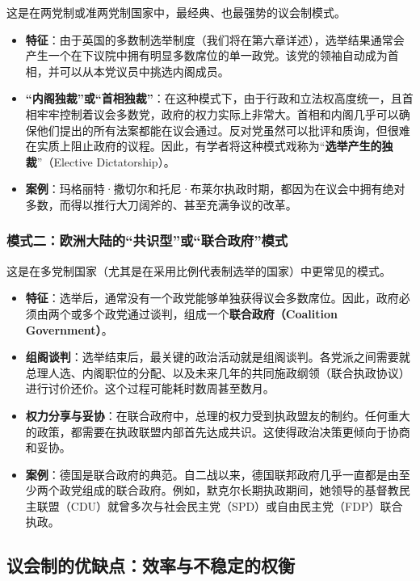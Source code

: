 这是在两党制或准两党制国家中，最经典、也最强势的议会制模式。
\begin{itemize}
    \item \textbf{特征}：由于英国的多数制选举制度（我们将在第六章详述），选举结果通常会产生一个在下议院中拥有明显多数席位的单一政党。该党的领袖自动成为首相，并可以从本党议员中挑选内阁成员。
    \item \textbf{“内阁独裁”或“首相独裁”}：在这种模式下，由于行政和立法权高度统一，且首相牢牢控制着议会多数党，政府的权力实际上非常大。首相和内阁几乎可以确保他们提出的所有法案都能在议会通过。反对党虽然可以批评和质询，但很难在实质上阻止政府的议程。因此，有学者将这种模式戏称为“\textbf{选举产生的独裁}”（Elective Dictatorship）。
    \item \textbf{案例}：玛格丽特·撒切尔和托尼·布莱尔执政时期，都因为在议会中拥有绝对多数，而得以推行大刀阔斧的、甚至充满争议的改革。
\end{itemize}

\subsubsection*{模式二：欧洲大陆的“共识型”或“联合政府”模式}

这是在多党制国家（尤其是在采用比例代表制选举的国家）中更常见的模式。
\begin{itemize}
    \item \textbf{特征}：选举后，通常没有一个政党能够单独获得议会多数席位。因此，政府必须由两个或多个政党通过谈判，组成一个\textbf{联合政府（Coalition Government）}。
    \item \textbf{组阁谈判}：选举结束后，最关键的政治活动就是组阁谈判。各党派之间需要就总理人选、内阁职位的分配、以及未来几年的共同施政纲领（联合执政协议）进行讨价还价。这个过程可能耗时数周甚至数月。
    \item \textbf{权力分享与妥协}：在联合政府中，总理的权力受到执政盟友的制约。任何重大的政策，都需要在执政联盟内部首先达成共识。这使得政治决策更倾向于协商和妥协。
    \item \textbf{案例}：德国是联合政府的典范。自二战以来，德国联邦政府几乎一直都是由至少两个政党组成的联合政府。例如，默克尔长期执政期间，她领导的基督教民主联盟（CDU）就曾多次与社会民主党（SPD）或自由民主党（FDP）联合执政。
\end{itemize}

\subsection{议会制的优缺点：效率与不稳定的权衡}

